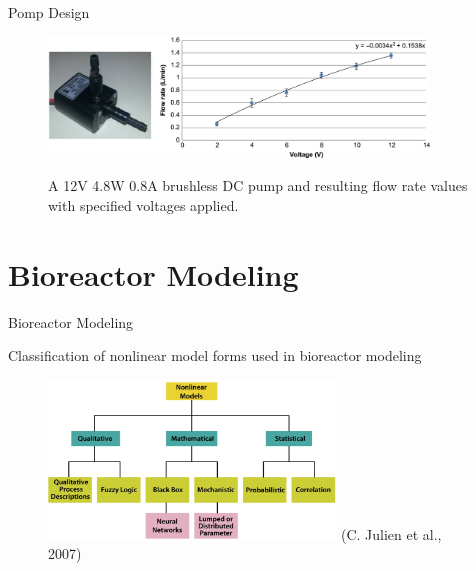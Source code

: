 \documentclass[11pt,t]{beamer}
\begin{document}
\begin{frame}[fragile]{Pomp Design}  

			\begin{figure}
			\centering
			\includegraphics[width=0.9\textwidth]{design_pomp}
			
			\vspace{15pt}
			\footnotesize A 12V 4.8W 0.8A brushless DC pump and resulting flow rate values with specified voltages applied.
			\end{figure}

\end{frame}


\section{Bioreactor Modeling}

\begin{frame}[fragile]{Bioreactor Modeling}  

 Classification of nonlinear model forms used in bioreactor modeling
	
			\begin{figure}
			\centering
			\includegraphics[width=0.68\textwidth]{models}			
			\footnotesize(C. Julien et al., 2007)
			\end{figure}
\end{frame}
\end{document}
